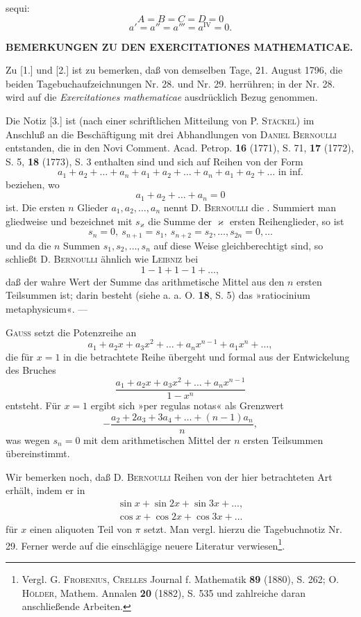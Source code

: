 \noindent sequi: 
\[A=B=C=D=0\]
\noindent{}
\[a'=a''=a'''=a^{\mathrm{IV}}=0.\]
\begin{center}\bfseries BEMERKUNGEN ZU DEN EXERCITATIONES MATHEMATICAE.\end{center}
\begingroup\small
\noindent\hspace*{\parindent}Zu [1.] und [2.] ist zu bemerken, daß von demselben Tage, 21. August 1796, die beiden Tagebuchaufzeichnungen
Nr. 28. und Nr. 29. herrühren; in der Nr. 28. wird auf die \textit{Exercitationes mathematicae} ausdrücklich Bezug genommen.

Die Notiz [3.] ist (nach einer schriftlichen Mitteilung von P. \textsc{Stäckel}) im Anschluß an die Beschäftigung
mit drei Abhandlungen von \textsc{Daniel Bernoulli} entstanden, die in den Novi Comment. Acad. Petrop.
\textbf{16} (1771), S. 71, \textbf{17} (1772), S. 5, \textbf{18} (1773), S. 3 enthalten sind und sich auf Reihen von der Form
\[a_1+a_2+\ldots+a_n+a_1+a_2+\ldots+a_n+a_1+a_2+\ldots\text{ in inf.}\]
\noindent beziehen, wo
\[a_1+a_2+\ldots+a_n=0\]
\noindent ist. Die ersten $n$ Glieder $a_1,a_2,\ldots,a_n$ nennt D. \textsc{Bernoulli} die .\linebreak
Summiert man gliedweise und bezeichnet mit $s_\varkappa$ die Summe der $\varkappa$ ersten Reihenglieder, so ist
\[s_n=0,\ s_{n+1}=s_1,\ s_{n+2}=s_2,\ldots,s_{2n}=0,\ldots\]
\noindent und da die $n$ Summen $s_1,s_2,\ldots,s_n$ auf diese Weise gleichberechtigt sind, so schließt D. \textsc{Bernoulli}
ähnlich wie \textsc{Leibniz} bei
\[1-1+1-1+\ldots,\]
\noindent daß der wahre Wert der Summe das arithmetische Mittel aus den $n$ ersten Teilsummen ist; darin besteht
(siehe a. a. O. \textbf{18}, S. 5) das »ratiocinium metaphysicum«. —

\textsc{Gauss} setzt die Potenzreihe an
\[a_1+a_2x+a_3x^2+\ldots+a_nx^{n-1}+a_1x^n+\ldots,\]
\noindent die für $x=1$ in die betrachtete Reihe übergeht und formal aus der Entwickelung des Bruches
\[\frac{a_1+a_2x+a_3x^2+\ldots+a_nx^{n-1}}{1-x^n}\]
\noindent entsteht. Für $x=1$ ergibt sich »per regulas notas« als Grenzwert
\[-\frac{a_2+2a_3+3a_4+\ldots+(n-1)a_n}{n},\]
\noindent was wegen $s_n=0$ mit dem arithmetischen Mittel der $n$ ersten Teilsummen übereinstimmt.

Wir bemerken noch, daß D. \textsc{Bernoulli} Reihen von der hier betrachteten Art erhält, indem er in
\[\begin{gathered}
\sin x+\sin2x+\sin3x+\ldots,\\
\cos x+\cos2x+\cos3x+\ldots
\end{gathered}\]
\clearpage
{}
\noindent für $x$ einen aliquoten Teil von $\pi$ setzt. Man vergl. hierzu die Tagebuchnotiz Nr. 29. Ferner werde auf
die einschlägige neuere Literatur verwiesen\footnote{Vergl. G. \textsc{Frobenius}, \textsc{Crelles} Journal f. Mathematik \textbf{89} (1880), S. 262;
O. \textsc{Hölder}, Mathem. Annalen \textbf{20} (1882), S. 535 und zahlreiche daran anschließende Arbeiten.}.

